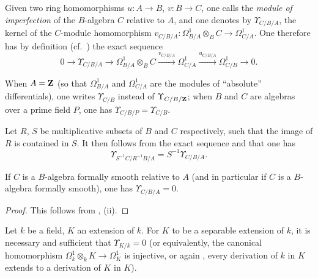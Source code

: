 \begin{definition}[20.6.1]
\label{0.20.6.1}
Given two ring homomorphisms $u:A\to B$, $v:B\to C$, one calls the \emph{module of imperfection} of the $B$-algebra $C$ relative to $A$, and one denotes by $\Upsilon_{C/B/A}$, the kernel of the $C$-module homomorphism $v_{C/B/A}:\Omega^1_{B/A}\otimes_B C\to\Omega^1_{C/A}$.
One therefore has by definition (cf.\ ) the exact sequence
\begin{equation}
\tag{20.6.1.1}
  \label{0.20.6.1.1}
  0\to\Upsilon_{C/B/A}\to\Omega^1_{B/A}\otimes_B C\xrightarrow{v_{C/B/A}}\Omega^1_{C/A}\xrightarrow{u_{C/B/A}}\Omega^1_{C/B}\to 0.
\end{equation}
\end{definition}

When $A=\mathbf{Z}$ (so that $\Omega^1_{B/A}$ and $\Omega^1_{C/A}$ are the modules of ``absolute'' differentials), one writes $\Upsilon_{C/B}$ instead of $\Upsilon_{C/B/\mathbf{Z}}$; when $B$ and $C$ are algebras over a prime field $P$, one has $\Upsilon_{C/B/P}=\Upsilon_{C/B}$.

Let $R$, $S$ be multiplicative subsets of $B$ and $C$ respectively, such that the image of $R$ is contained in $S$.
It then follows from the exact sequence  and  that one has
\begin{equation}
\tag{20.6.1.2}
  \label{0.20.6.1.2}
  \Upsilon_{S^{-1}C/R^{-1}B/A}=S^{-1}\Upsilon_{C/B/A}.
\end{equation}

\begin{proposition}[20.6.2]
\label{0.20.6.2}
If $C$ is a $B$-algebra formally smooth relative to $A$ \textup{(}and in particular if $C$ is a $B$-algebra formally smooth\textup{)}, one has $\Upsilon_{C/B/A}=0$.
\end{proposition}

\begin{proof}
This follows from , (ii).
\end{proof}

\begin{proposition}[20.6.3]
\label{0.20.6.3}
Let $k$ be a field, $K$ an extension of $k$.
For $K$ to be a separable extension of $k$, it is necessary and sufficient that $\Upsilon_{K/k}=0$ \textup{(}or equivalently, the canonical homomorphism $\Omega^1_k\otimes_k K\to\Omega^1_K$ is injective, or again , every derivation of $k$ in $K$ extends to a derivation of $K$ in $K$\textup{)}.
\end{proposition}

